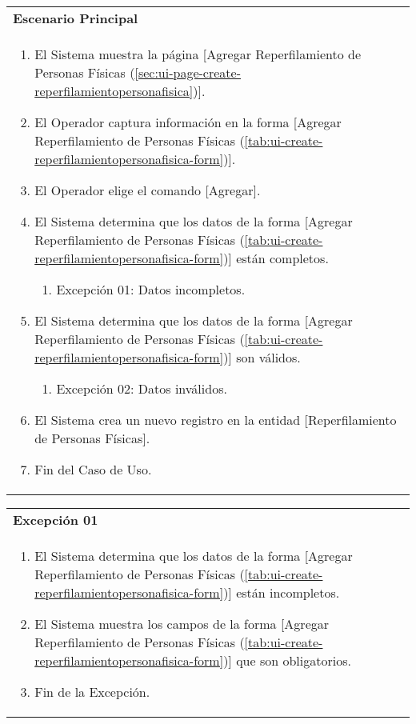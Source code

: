 	\begin{tabular}{ p{15.5cm} }
		\textbf{Escenario Principal} \\
		\begin{enumerate}
			\item El Sistema muestra la p\'agina [Agregar Reperfilamiento de Personas F\'isicas (\ref{sec:ui-page-create-reperfilamientopersonafisica})].
			\item El Operador captura informaci\'on en la forma [Agregar Reperfilamiento de Personas F\'isicas (\ref{tab:ui-create-reperfilamientopersonafisica-form})].
			\item El Operador elige el comando [Agregar].
			\item El Sistema determina que los datos de la forma [Agregar Reperfilamiento de Personas F\'isicas (\ref{tab:ui-create-reperfilamientopersonafisica-form})] est\'an completos.
				\begin{enumerate}
					\item Excepci\'on 01: Datos incompletos.
				\end{enumerate}
			\item El Sistema determina que los datos de la forma [Agregar Reperfilamiento de Personas F\'isicas (\ref{tab:ui-create-reperfilamientopersonafisica-form})] son v\'alidos.
				\begin{enumerate}
					\item Excepci\'on 02: Datos inv\'alidos.
				\end{enumerate}
			\item El Sistema crea un nuevo registro en la entidad [Reperfilamiento de Personas F\'isicas].
			\item Fin del Caso de Uso.
		\end{enumerate}
	\end{tabular}
	
	\begin{tabular}{ p{15.5cm} }
		\textbf{Excepci\'on 01} \\
		\begin{enumerate}
			\item El Sistema determina que los datos de la forma [Agregar Reperfilamiento de Personas F\'isicas (\ref{tab:ui-create-reperfilamientopersonafisica-form})] est\'an incompletos.
			\item El Sistema muestra los campos de la forma [Agregar Reperfilamiento de Personas F\'isicas (\ref{tab:ui-create-reperfilamientopersonafisica-form})] que son obligatorios.
			\item Fin de la Excepci\'on.
		\end{enumerate}
	\end{tabular}
	
